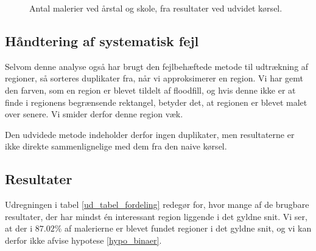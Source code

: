 {\begin{figure}[!h]
    \centering
    \hspace{1em}
    \caption[]{Antal malerier ved årstal og skole, fra resultater
    ved udvidet kørsel.}
    \label{ud_year_nation}
\end{figure}

\subsection{Håndtering af systematisk fejl}
Selvom denne analyse også har brugt den fejlbehæftede metode til
udtrækning af regioner, så sorteres duplikater fra, når vi approksimerer
en region. Vi har gemt den farven, som en region er blevet tildelt af
floodfill, og hvis denne ikke er at finde i regionens begrænsende
rektangel, betyder det, at regionen er blevet malet over senere. Vi
smider derfor denne region væk.

Den udvidede metode indeholder derfor ingen duplikater, men resultaterne
er ikke direkte sammenlignelige med dem fra den naive kørsel.

\subsection{Resultater}
Udregningen i tabel \ref{ud_tabel_fordeling} redegør for, hvor mange af
de brugbare resultater, der har mindst én interessant region liggende i
det gyldne snit. Vi ser, at der i $87.02\%$ af malerierne er blevet
fundet regioner i det gyldne snit, og vi kan derfor ikke afvise hypotese
\ref{hypo_binaer}.

}
